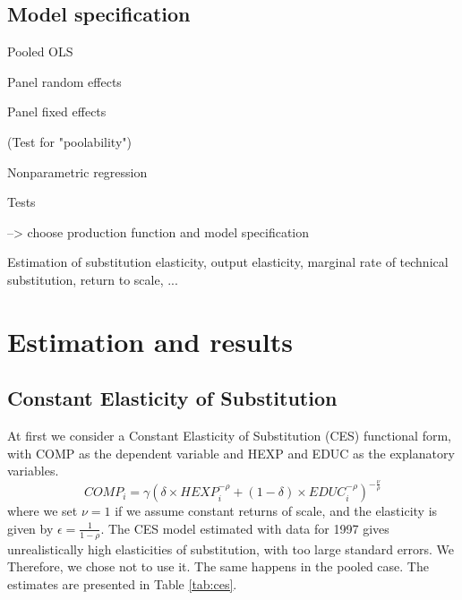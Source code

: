 \documentclass[12pt,a4paper]{article}\usepackage[]{graphicx}\usepackage[]{color}
\begin{document}
\subsection{Model specification}




Pooled OLS

Panel random effects

Panel fixed effects

(Test for "poolability")

Nonparametric regression

Tests

--> choose production function and model specification

Estimation of substitution elasticity, output elasticity, marginal rate of technical substitution, return to scale, ...












\section{Estimation and results}





\subsection{Constant Elasticity of Substitution}
At first we consider a Constant Elasticity of Substitution (CES) functional form, with COMP as the dependent variable and HEXP and EDUC as the explanatory variables.
\begin{equation}
COMP_i = \gamma \left( \delta \times HEXP_i^{-\rho} + (1- \delta) \times EDUC_i^{-\rho} \right)^{-\frac{\nu}{\rho}}
\end{equation}
where we set $\nu = 1$ if we assume constant returns of scale, and the elasticity is given by $\epsilon = \frac{1}{1- \rho}$. The CES model estimated with data for 1997 gives unrealistically high elasticities of substitution, with too large standard errors. We Therefore, we chose not to use it. The same happens in the pooled case. The estimates are presented in Table \ref{tab:ces}.

\end{document}
